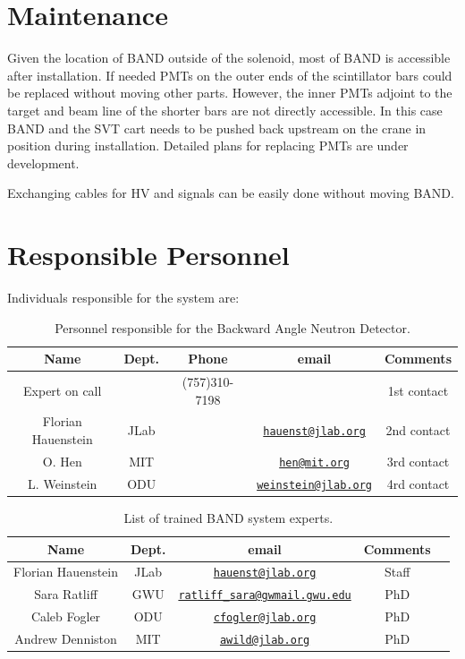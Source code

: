 \documentclass[12pt,letterpaper]{article}
\begin{document}
\section{Maintenance}
Given the location of BAND outside of the solenoid, most of BAND is accessible after installation. If needed PMTs on the outer ends of the scintillator bars could be replaced without moving other parts. However, the inner PMTs adjoint to the target and beam line of the shorter bars are not directly accessible. In this case BAND and the SVT cart needs to be pushed back upstream on the crane in position during installation.
Detailed plans for replacing PMTs are under development.

Exchanging cables for HV and signals can be easily done without moving BAND.

\section{Responsible Personnel}
\label{sec:personnel}
Individuals responsible for the system are:

\begin{table}[!htb]
 \centering
 \begin{tabular}{|c|c|c|c|c|}
\hline
 Name&Dept.&Phone&email&Comments \\ \hline
 Expert on call &  & (757)310-7198 & & 1st contact \\ \hline
Florian Hauenstein & JLab & & \href{mailto:hauenst@jlab.org}{\nolinkurl{hauenst@jlab.org}} & 2nd contact \\ \hline
O. Hen & MIT & &\href{mailto:hen@mit.org}{\nolinkurl{hen@mit.org}}& 3rd contact \\ \hline
L. Weinstein & ODU &  &\href{mailto:weinstein@jlab.org}{\nolinkurl{weinstein@jlab.org}}& 4rd  contact  \\ \hline

\end{tabular}
\caption{Personnel responsible for the Backward Angle Neutron Detector.} 
\label{table:personnelband}
\end{table}


\begin{table}[!htb]
 \centering
 \begin{tabular}{|c|c|c|c|c|}
\hline
 Name&Dept.& email&Comments \\ \hline
Florian Hauenstein & JLab &  \href{mailto:hauenst@jlab.org}{\nolinkurl{hauenst@jlab.org}} & Staff \\ \hline
Sara Ratliff & GWU & \href{mailto:ratliff_sara@gwmail.gwu.edu}{\nolinkurl{ratliff_sara@gwmail.gwu.edu}}& PhD \\ \hline
Caleb Fogler & ODU &  \href{mailto:cfogler@jlab.org}{\nolinkurl{cfogler@jlab.org}}& PhD  \\ \hline
Andrew Denniston & MIT &  \href{mailto:awild@jlab.org}{\nolinkurl{awild@jlab.org}}& PhD \\ \hline

\end{tabular}
\caption{List of trained BAND system experts.} 
\label{table:expertsband}
\end{table}
\end{document}
